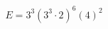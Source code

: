 \documentclass[preview]{standalone}
\begin{document}
\begin{align*}
E = 3^3 (3^3 \cdot 2)^6 (4)^2
\end{align*}
\end{document}
